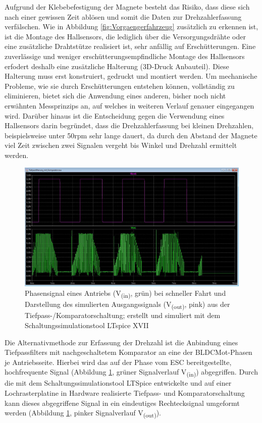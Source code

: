 Aufgrund der Klebebefestigung der Magnete besteht das Risiko, dass diese sich nach einer gewissen Zeit ablösen und somit die Daten zur Drehzahlerfassung verfälschen. Wie in Abbildung \ref{fig:Vorgaengerfahrzeug} zusätzlich zu erkennen ist, ist die Montage des Hallsensors, die lediglich über die Versorgungsdrähte oder eine zusätzliche Drahtstütze realisiert ist, sehr anfällig auf Erschütterungen. Eine zuverlässige und weniger erschütterungsempfindliche Montage des Hallsensors erfodert deshalb eine zusätzliche Halterung (3D-Druck Anbauteil). Diese Halterung muss erst konstruiert, gedruckt und montiert werden. Um mechanische Probleme, wie sie durch Erschütterungen entstehen können, vollständig zu eliminieren, bietet sich die Anwendung eines anderen, bisher noch nicht erwähnten Messprinzips an, auf welches in weiteren Verlauf genauer eingegangen wird. Darüber hinaus ist die Entscheidung gegen die Verwendung eines Hallsensors darin begründet, dass die Drehzahlerfassung bei kleinen Drehzahlen, beispielsweise unter 50rpm sehr lange dauert, da durch den Abstand der Magnete viel Zeit zwischen zwei Signalen vergeht bis Winkel und Drehzahl ermittelt werden.

\begin{figure}[H] %
\includegraphics[width=.99\textwidth]{sec4/images/Signaldarstellung} 
\centering
\captionsetup{width=.95\textwidth}
\caption[Phaseneingangssignal und Ausgangssignal der Tiefpass-/Komparatorschaltung]{Phasensignal eines Antriebs (V\textsubscript{(in)}, grün) bei schneller Fahrt und Darstellung des simulierten Ausgangssignals (V\textsubscript{(out)}, pink) aus der Tiefpass-/Komparatorschaltung; erstellt und simuliert mit dem Schaltungssimulationstool LTspice XVII}\centering
\label{fig:Signaldarstellung}
\end{figure}

Die Alternativmethode zur Erfassung der Drehzahl ist die Anbindung eines Tiefpassfilters mit nachgeschaltetem Komparator an eine der \ac{BLDCMot}-Phasen je Antriebsseite. Hierbei wird das auf der Phase vom \ac{ESC} bereitgestellte, hochfrequente Signal (Abbildung \ref{fig:Signaldarstellung}, grüner Signalverlauf V\textsubscript{(in)}) abgegriffen. Durch die mit dem Schaltungssimulationstool LTSpice entwickelte und auf einer Lochrasterplatine in Hardware realisierte Tiefpass- und Komparatorschaltung kann dieses abgegriffene Signal in ein eindeutiges Rechtecksignal umgeformt werden (Abbildung \ref{fig:Signaldarstellung}, pinker Signalverlauf V\textsubscript{(out)}).\vspace{11pt}

